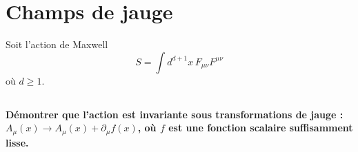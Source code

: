 \documentclass{article}
\numberwithin{equation}{section}
\theoremstyle{solution}
\begin{document}
\section{Champs de jauge}
Soit l'action de Maxwell
\begin{equation}\label{eq:MaxwellAction}
       S = \int d^{d+1}x\, F_{\mu\nu}F^{\mu\nu}
\end{equation} 
où $d \geq 1$.
\subsection{}
\textbf{Démontrer que l’action est invariante sous transformations de jauge : $A_{\mu}(x) \rightarrow A_{\mu}(x) +
\partial_{\mu}f(x)$, où $f$ est une fonction scalaire suffisamment lisse.}
\vspace{2ex}
\end{document}
